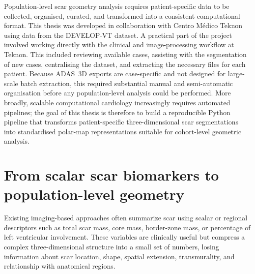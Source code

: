 Population-level scar geometry analysis requires patient-specific data to be collected,
organised, curated, and transformed into a consistent computational format. This thesis
was developed in collaboration with Centro M\'{e}dico Teknon using data from the
DEVELOP-VT dataset. A practical part of the project involved working directly with the
clinical and image-processing workflow at Teknon. This included reviewing available cases,
assisting with the segmentation of new cases, centralising the dataset, and extracting the
necessary files for each patient. Because ADAS~3D exports are case-specific and not
designed for large-scale batch extraction, this required substantial manual and
semi-automatic organisation before any population-level analysis could be performed.
More broadly, scalable computational cardiology increasingly requires automated pipelines;
the goal of this thesis is therefore to build a reproducible Python pipeline that transforms
patient-specific three-dimensional scar segmentations into standardised polar-map
representations suitable for cohort-level geometric analysis.

\section*{From scalar scar biomarkers to population-level geometry}

Existing imaging-based approaches often summarize scar using scalar or regional
descriptors such as total scar mass, core mass, border-zone mass, or percentage of left
ventricular involvement. These variables are clinically useful but compress a complex
three-dimensional structure into a small set of numbers, losing information about scar
location, shape, spatial extension, transmurality, and relationship with anatomical regions.

